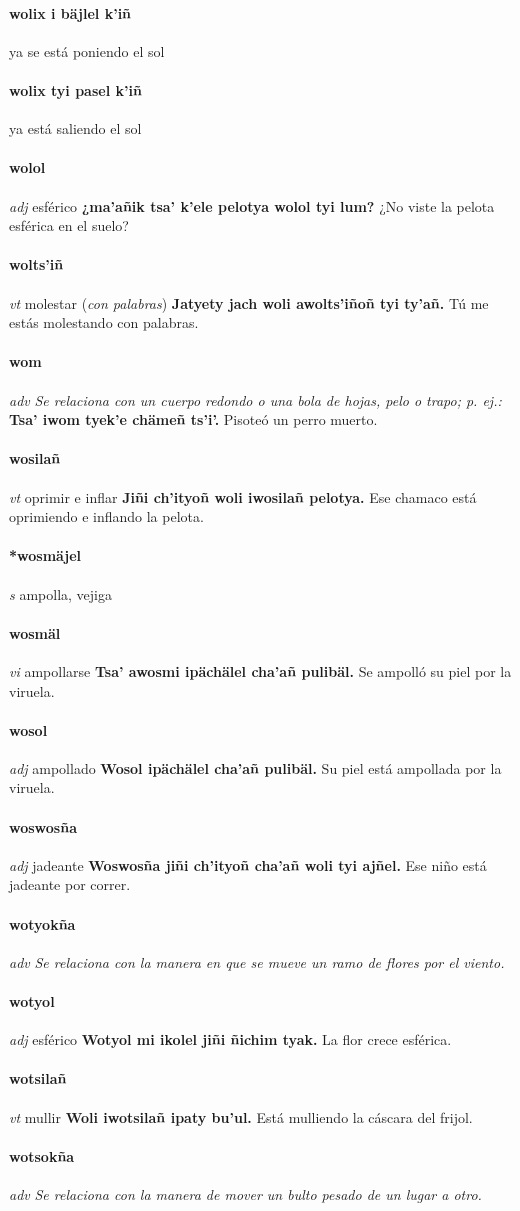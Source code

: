 \documentclass{scrbook}
\newcommand{\entry}[1]{\paragraph{#1}}
\newcommand{\nontranslationdef}[1]{\textit{#1}}
\newcommand{\partofspeech}[1]{\textit{#1}}
\newcommand{\spanishtranslation}[1]{#1}
\newcommand{\clarification}[1]{(\textit{#1})}
\newcommand{\cholexample}[1]{\textbf{#1}}
\newcommand{\exampletranslation}[1]{#1}
\begin{document}
\begin{multicols}{2}
\entry{wolix i bäjlel k'iñ}
\spanishtranslation{ya se está poniendo el sol}

\entry{wolix tyi pasel k'iñ}
\spanishtranslation{ya está saliendo el sol}

\entry{wolol}
\partofspeech{adj}
\spanishtranslation{esférico}
\cholexample{¿ma'añik tsa' k'ele pelotya wolol tyi lum?}
\exampletranslation{¿No viste la pelota esférica en el suelo?}

\entry{wolts'iñ}
\partofspeech{vt}
\spanishtranslation{molestar}
\clarification{con palabras}
\cholexample{Jatyety jach woli awolts'iñoñ tyi ty'añ.}
\exampletranslation{Tú me estás molestando con palabras.}

\entry{wom}
\partofspeech{adv}
\nontranslationdef{Se relaciona con un cuerpo redondo o una bola de hojas, pelo o trapo; p. ej.:}
\cholexample{Tsa' iwom tyek'e chämeñ ts'i'.}
\exampletranslation{Pisoteó un perro muerto.}

\entry{wosilañ}
\partofspeech{vt}
\spanishtranslation{oprimir e inflar}
\cholexample{Jiñi ch'ityoñ woli iwosilañ pelotya.}
\exampletranslation{Ese chamaco está oprimiendo e inflando la pelota.}

\entry{*wosmäjel}
\partofspeech{s}
\spanishtranslation{ampolla, vejiga}

\entry{wosmäl}
\partofspeech{vi}
\spanishtranslation{ampollarse}
\cholexample{Tsa' awosmi ipächälel cha'añ pulibäl.}
\exampletranslation{Se ampolló su piel por la viruela.}

\entry{wosol}
\partofspeech{adj}
\spanishtranslation{ampollado}
\cholexample{Wosol ipächälel cha'añ pulibäl.}
\exampletranslation{Su piel está ampollada por la viruela.}

\entry{woswosña}
\partofspeech{adj}
\spanishtranslation{jadeante}
\cholexample{Woswosña jiñi ch'ityoñ cha'añ woli tyi ajñel.}
\exampletranslation{Ese niño está jadeante por correr.}

\entry{wotyokña}
\partofspeech{adv}
\nontranslationdef{Se relaciona con la manera en que se mueve un ramo de flores por el viento.}

\entry{wotyol}
\partofspeech{adj}
\spanishtranslation{esférico}
\cholexample{Wotyol mi ikolel jiñi ñichim tyak.}
\exampletranslation{La flor crece esférica.}

\entry{wotsilañ}
\partofspeech{vt}
\spanishtranslation{mullir}
\cholexample{Woli iwotsilañ ipaty bu'ul.}
\exampletranslation{Está mulliendo la cáscara del frijol.}

\entry{wotsokña}
\partofspeech{adv}
\nontranslationdef{Se relaciona con la manera de mover un bulto pesado de un lugar a otro.}


\end{multicols}
\end{document}
